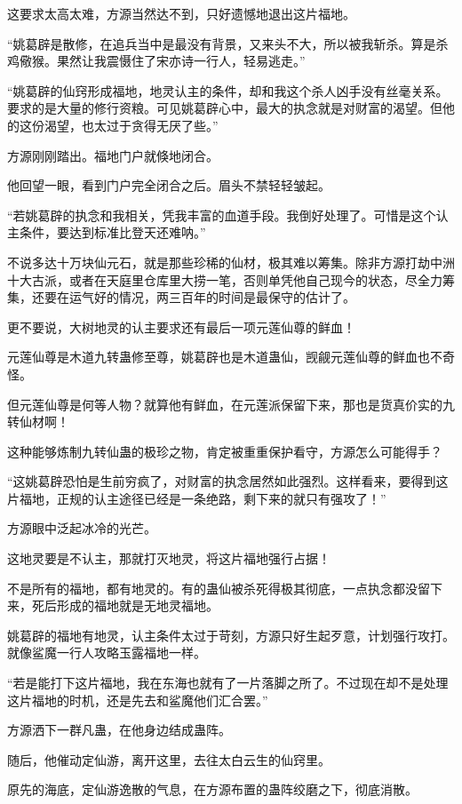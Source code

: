 \begin{this_body}
这要求太高太难，方源当然达不到，只好遗憾地退出这片福地。

“姚葛辟是散修，在追兵当中是最没有背景，又来头不大，所以被我斩杀。算是杀鸡儆猴。果然让我震慑住了宋亦诗一行人，轻易逃走。”

“姚葛辟的仙窍形成福地，地灵认主的条件，却和我这个杀人凶手没有丝毫关系。要求的是大量的修行资粮。可见姚葛辟心中，最大的执念就是对财富的渴望。但他的这份渴望，也太过于贪得无厌了些。”

方源刚刚踏出。福地门户就倏地闭合。

他回望一眼，看到门户完全闭合之后。眉头不禁轻轻皱起。

“若姚葛辟的执念和我相关，凭我丰富的血道手段。我倒好处理了。可惜是这个认主条件，要达到标准比登天还难呐。”

不说多达十万块仙元石，就是那些珍稀的仙材，极其难以筹集。除非方源打劫中洲十大古派，或者在天庭里仓库里大捞一笔，否则单凭他自己现今的状态，尽全力筹集，还要在运气好的情况，两三百年的时间是最保守的估计了。

更不要说，大树地灵的认主要求还有最后一项元莲仙尊的鲜血！

元莲仙尊是木道九转蛊修至尊，姚葛辟也是木道蛊仙，觊觎元莲仙尊的鲜血也不奇怪。

但元莲仙尊是何等人物？就算他有鲜血，在元莲派保留下来，那也是货真价实的九转仙材啊！

这种能够炼制九转仙蛊的极珍之物，肯定被重重保护看守，方源怎么可能得手？

“这姚葛辟恐怕是生前穷疯了，对财富的执念居然如此强烈。这样看来，要得到这片福地，正规的认主途径已经是一条绝路，剩下来的就只有强攻了！”

方源眼中泛起冰冷的光芒。

这地灵要是不认主，那就打灭地灵，将这片福地强行占据！

不是所有的福地，都有地灵的。有的蛊仙被杀死得极其彻底，一点执念都没留下来，死后形成的福地就是无地灵福地。

姚葛辟的福地有地灵，认主条件太过于苛刻，方源只好生起歹意，计划强行攻打。就像鲨魔一行人攻略玉露福地一样。

“若是能打下这片福地，我在东海也就有了一片落脚之所了。不过现在却不是处理这片福地的时机，还是先去和鲨魔他们汇合罢。”

方源洒下一群凡蛊，在他身边结成蛊阵。

随后，他催动定仙游，离开这里，去往太白云生的仙窍里。

原先的海底，定仙游逸散的气息，在方源布置的蛊阵绞磨之下，彻底消散。


\end{this_body}
